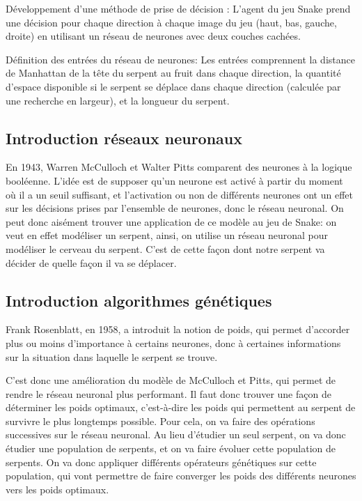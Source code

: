 \documentclass[11pt,a4paper]{article}
\begin{document}
Développement d'une méthode de prise de décision : L'agent du jeu Snake prend une décision pour chaque direction à chaque image du jeu (haut, bas, gauche, droite) en utilisant un réseau de neurones avec deux couches cachées.

Définition des entrées du réseau de neurones: Les entrées comprennent la distance de Manhattan de la tête du serpent au fruit dans chaque direction, la quantité d'espace disponible si le serpent se déplace dans chaque direction (calculée par une recherche en largeur), et la longueur du serpent.


\subsection{Introduction réseaux neuronaux}

En 1943, Warren McCulloch et Walter Pitts comparent des neurones à la logique booléenne. 
L'idée est de supposer qu'un neurone est activé à partir du moment où il a un seuil suffisant, et l'activation ou non de différents neurones ont un effet sur les décisions prises par l'ensemble de neurones, donc le réseau neuronal.
On peut donc aisément trouver une application de ce modèle au jeu de Snake: on veut en effet modéliser un serpent, ainsi, on utilise un réseau neuronal pour modéliser le cerveau du serpent.
C'est de cette façon dont notre serpent va décider de quelle façon il va se déplacer. 

\subsection{Introduction algorithmes génétiques}

Frank Rosenblatt, en 1958, a introduit la notion de poids, qui permet d'accorder plus ou moins d'importance à certains neurones, donc à certaines informations sur la situation dans laquelle le serpent se trouve.

C'est donc une amélioration du modèle de McCulloch et Pitts, qui permet de rendre le réseau neuronal plus performant.
Il faut donc trouver une façon de déterminer les poids optimaux, c'est-à-dire les poids qui permettent au serpent de survivre le plus longtemps possible.
Pour cela, on va faire des opérations successives sur le réseau neuronal.
Au lieu d'étudier un seul serpent, on va donc étudier une population de serpents, et on va faire évoluer cette population de serpents.
On va donc appliquer différents opérateurs génétiques sur cette population, qui vont permettre de faire converger les poids des différents neurones vers les poids optimaux.
\end{document}
